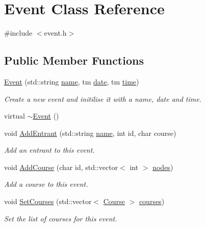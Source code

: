 \hypertarget{classEvent}{\section{\-Event \-Class \-Reference}
\label{classEvent}
}


{\ttfamily \#include $<$event.\-h$>$}

\subsection*{\-Public \-Member \-Functions}
\begin{DoxyCompactItemize}
\item 
\hyperlink{classEvent_a8f1894bd5c65c832e95b42bd4565e631}{\-Event} (std\-::string \hyperlink{classEvent_ae116bf76fb01a92e000579a5a0d6f35c}{name}, tm \hyperlink{classEvent_a5df9ecce46e9db33b3b29b99156aa70a}{date}, tm \hyperlink{classEvent_a91d5938dce4b4328e35f5626c22ec844}{time})
\begin{DoxyCompactList}\small\item\em \-Create a new event and initilise it with a name, date and time. \end{DoxyCompactList}\item 
virtual \hyperlink{classEvent_a7704ec01ce91e673885792054214b3d2}{$\sim$\-Event} ()
\item 
void \hyperlink{classEvent_af38a15ffed314b5251a124f45ea41575}{\-Add\-Entrant} (std\-::string \hyperlink{classEvent_ae116bf76fb01a92e000579a5a0d6f35c}{name}, int id, char course)
\begin{DoxyCompactList}\small\item\em \-Add an entrant to this event. \end{DoxyCompactList}\item 
void \hyperlink{classEvent_a1a1fba26c0066499be299b3d3ff938b5}{\-Add\-Course} (char id, std\-::vector$<$ int $>$ \hyperlink{classEvent_a2b330c8081c3c907a02daa7da8043fc6}{nodes})
\begin{DoxyCompactList}\small\item\em \-Add a course to this event. \end{DoxyCompactList}\item 
void \hyperlink{classEvent_a894b95d4d8b4844798ec95fa5ef8141a}{\-Set\-Courses} (std\-::vector$<$ \hyperlink{classCourse}{\-Course} $>$ \hyperlink{classEvent_a54f5b521beee9f8714ac33e304c948b0}{courses})
\begin{DoxyCompactList}\small\item\em \-Set the list of courses for this event. \end{DoxyCompactList}\item 

\end{DoxyCompactItemize}
